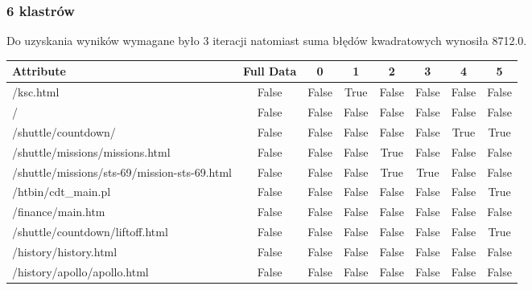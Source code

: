 \documentclass[../EDI_Task1_Karwowski_Kowalewski.tex]{subfiles}
\begin{document}
{{        \subsubsection{6 klastrów} {

            Do uzyskania wyników wymagane było 3 iteracji natomiast suma błędów
            kwadratowych wynosiła 8712.0.
            \begin{table}[!htbp]
                \footnotesize
                \centering
                \begin{tabular}{|l|c|c|c|c|c|c|c|}
                    \hline
                    Attribute                                        &  Full Data   &       0   &       1   &       2   &       3   &       4   &       5 \\ \hline
                    /ksc.html                                        &      False   &   False   &    True   &   False   &   False   &   False   &   False \\
                    /                                                &      False   &   False   &   False   &   False   &   False   &   False   &   False \\
                    /shuttle/countdown/                              &      False   &   False   &   False   &   False   &   False   &    True   &    True \\
                    /shuttle/missions/missions.html                  &      False   &   False   &   False   &    True   &   False   &   False   &   False \\
                    /shuttle/missions/sts-69/mission-sts-69.html     &      False   &   False   &   False   &    True   &    True   &   False   &   False \\
                    /htbin/cdt\_main.pl                               &      False   &   False   &   False   &   False   &   False   &   False   &    True \\
                    /finance/main.htm                                &      False   &   False   &   False   &   False   &   False   &   False   &   False \\
                    /shuttle/countdown/liftoff.html                  &      False   &   False   &   False   &   False   &   False   &   False   &    True \\
                    /history/history.html                            &      False   &   False   &   False   &   False   &   False   &   False   &   False \\
                    /history/apollo/apollo.html                      &      False   &   False   &   False   &   False   &   False   &   False   &   False \\

\end{tabular}
\end{table}}}}
\end{document}
